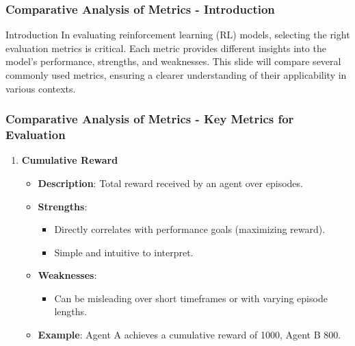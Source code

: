 \documentclass{beamer}
\begin{document}
\begin{frame}[fragile]
    \frametitle{Comparative Analysis of Metrics - Introduction}
    \begin{block}{Introduction}
        In evaluating reinforcement learning (RL) models, selecting the right evaluation metrics is critical. Each metric provides different insights into the model's performance, strengths, and weaknesses. This slide will compare several commonly used metrics, ensuring a clearer understanding of their applicability in various contexts.
    \end{block}
\end{frame}

\begin{frame}[fragile]
    \frametitle{Comparative Analysis of Metrics - Key Metrics for Evaluation}
    \begin{enumerate}
        \item \textbf{Cumulative Reward}
            \begin{itemize}
                \item \textbf{Description}: Total reward received by an agent over episodes.
                \item \textbf{Strengths}:
                    \begin{itemize}
                        \item Directly correlates with performance goals (maximizing reward).
                        \item Simple and intuitive to interpret.
                    \end{itemize}
                \item \textbf{Weaknesses}:
                    \begin{itemize}
                        \item Can be misleading over short timeframes or with varying episode lengths.
                    \end{itemize}
                \item \textbf{Example}: Agent A achieves a cumulative reward of 1000, Agent B 800.
            \end{itemize}
        

\end{enumerate}
\end{frame}
\end{document}

